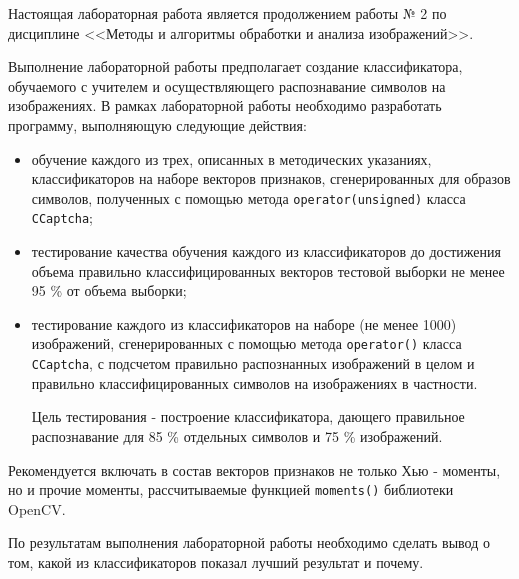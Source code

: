 
Настоящая лабораторная работа является продолжением работы № 2 по дисциплине <<Методы и алгоритмы обработки и анализа изображений>>.

Выполнение лабораторной работы предполагает создание классификатора, обучаемого с учителем и осуществляющего распознавание символов на изображениях. В рамках лабораторной работы необходимо разработать программу, выполняющую следующие действия:

\begin{itemize}

	\item обучение каждого из трех, описанных в методических указаниях, классификаторов на наборе векторов признаков, сгенерированных для образов символов, полученных с помощью метода \verb|operator(unsigned)| класса \verb|CCaptcha|;
	\item тестирование качества обучения каждого из классификаторов до достижения объема правильно классифицированных векторов тестовой выборки не менее 95 \% от объема выборки;
	\item тестирование каждого из классификаторов на наборе (не менее 1000) изображений, сгенерированных с помощью метода \verb|operator()| класса \verb|CCaptcha|, с подсчетом правильно распознанных изображений в целом и правильно классифицированных символов на изображениях в частности.

	Цель тестирования - построение классификатора, дающего правильное распознавание для 85 \% отдельных символов и 75 \% изображений.

\end{itemize}

Рекомендуется включать в состав векторов признаков не только Хью - моменты, но и прочие моменты, рассчитываемые функцией \verb|moments()| библиотеки OpenCV.

По результатам выполнения лабораторной работы необходимо сделать вывод о том, какой из классификаторов показал лучший результат и почему.

